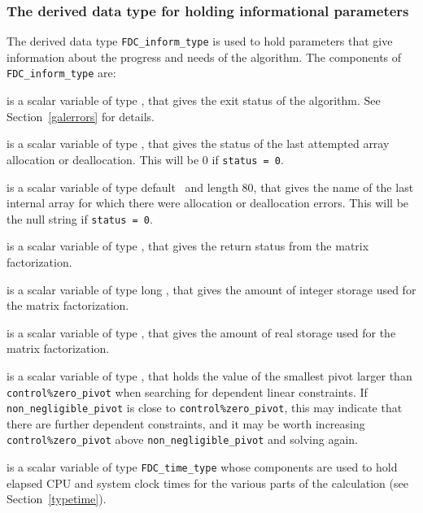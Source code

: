 \documentclass{galahad}
\newcommand{\packagename}{FDC}
\begin{document}

\subsubsection{The derived data type for holding informational
 parameters}\label{typeinform}
The derived data type
{\tt \packagename\_inform\_type}
is used to hold parameters that give information about the progress and needs
of the algorithm. The components of
{\tt \packagename\_inform\_type}
are:

\begin{description}

 is a scalar variable of type \integer, that gives the
exit status of the algorithm.
See Section~\ref{galerrors}
for details.

 is a scalar variable of type \integer, that gives
the status of the last attempted array allocation or deallocation.
This will be 0 if {\tt status = 0}.

 is a scalar variable of type default \character\
and length 80, that  gives the name of the last internal array
for which there were allocation or deallocation errors.
This will be the null string if {\tt status = 0}.

 is a scalar variable of type \integer, that
gives the return status from the matrix factorization.

 is a scalar variable of type long
\integer, that gives the amount of integer storage used for the matrix
factorization.

 is a scalar variable of type \longinteger,
that gives the amount of real storage used for the matrix factorization.

 is a scalar variable of type \realdp,
that holds the value of the smallest pivot larger than
{\tt control\%zero\_pivot}
when searching for dependent linear constraints. If
{\tt non\_negligible\_pivot} is close to  {\tt control\%zero\_pivot},
this may indicate that there are further dependent constraints, and
it may be worth increasing {\tt control\%zero\_pivot} above
{\tt non\_negligible\_pivot} and solving again.

 is a scalar variable of type {\tt \packagename\_time\_type}
whose components are used to hold elapsed CPU and system clock
times for the various parts of the calculation (see Section~\ref{typetime}).


\end{description}
\end{document}
